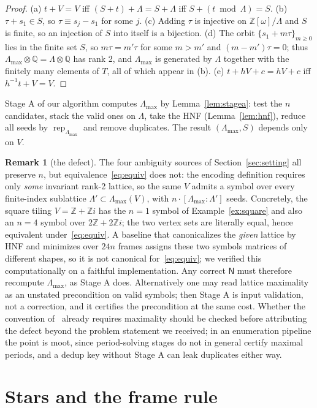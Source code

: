 \documentclass[11pt]{article}
\theoremstyle{definition}
\newtheorem{remark}[theorem]{Remark}
\newcommand{\Zw}{\mathbb{Z}[\omega]}
\newcommand{\Z}{\mathbb{Z}}
\newcommand{\Q}{\mathbb{Q}}
\newcommand{\Lam}{\Lambda}
\newcommand{\Lmax}{\Lambda_{\max}}
\newcommand{\rep}{\operatorname{rep}}
\newcommand{\N}{\mathsf{N}}
\begin{document}
\begin{proof}
(a) $t+V=V$ iff $(S+t)+\Lam=S+\Lam$ iff $S+(t\bmod\Lam)=S$. (b) $\tau+s_1\in S$, so
$\tau\equiv s_j-s_1$ for some $j$. (c) Adding $\tau$ is injective on $\Zw/\Lam$ and $S$ is
finite, so an injection of $S$ into itself is a bijection. (d) The orbit
$\{s_1+m\tau\}_{m\ge0}$ lies in the finite set $S$, so $m\tau=m'\tau$ for some $m>m'$ and
$(m-m')\tau=0$; thus $\Lmax\otimes\Q=\Lam\otimes\Q$ has rank 2, and $\Lmax$ is generated by
$\Lam$ together with the finitely many elements of $T$, all of which appear in (b).
(e) $t+hV+c=hV+c$ iff $h^{-1}t+V=V$.
\end{proof}

Stage A of our algorithm computes $\Lmax$ by Lemma~\ref{lem:stagea}: test the $n$
candidates, stack the valid ones on $\Lam$, take the HNF (Lemma~\ref{lem:hnf}), reduce all
seeds by $\rep_{\Lmax}$ and remove duplicates. The result $(\Lmax,S)$ depends only on $V$.

\begin{remark}[the defect]\label{rem:gap}
The four ambiguity sources of Section~\ref{sec:setting} all preserve $n$, but
equivalence~\eqref{eq:equiv} does not: the encoding definition requires only \emph{some}
invariant rank-2 lattice, so the same $V$ admits a symbol over every finite-index sublattice
$\Lam'\subset\Lmax(V)$, with $n\cdot[\Lmax:\Lam']$ seeds. Concretely, the square tiling
$V=\Z+\Z i$ has the $n{=}1$ symbol of Example~\ref{ex:square} and also an $n{=}4$ symbol
over $2\Z+2\Z i$; the two vertex sets are literally equal, hence equivalent
under~\eqref{eq:equiv}. A baseline that canonicalizes the \emph{given} lattice by HNF and
minimizes over $24n$ frames assigns these two symbols matrices of different shapes, so it
is not canonical for~\eqref{eq:equiv}; we verified this computationally on a faithful
implementation. Any correct $\N$ must therefore recompute $\Lmax$, as Stage A does.
Alternatively one may read lattice maximality as an unstated precondition on valid symbols;
then Stage A is input validation, not a correction, and it certifies the
precondition at the same cost. Whether the convention of~\cite{soto2021integer} already
requires maximality should be checked before attributing the defect beyond the problem
statement we received; in an enumeration pipeline the point is moot, since period-solving
stages do not in general certify maximal periods, and a dedup key without Stage A can leak
duplicates either way.
\end{remark}

\section{Stars and the frame rule}\label{sec:stars}
\end{document}
